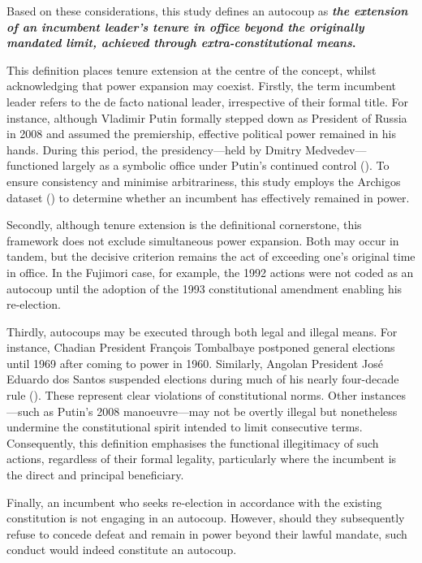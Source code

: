 \documentclass[
  12pt,
]{report}
\begin{document}
Based on these considerations, this study defines an autocoup as
\textbf{\emph{the extension of an incumbent leader's tenure in office
beyond the originally mandated limit, achieved through
extra-constitutional means}.}

This definition places tenure extension at the centre of the concept,
whilst acknowledging that power expansion may coexist. Firstly, the term
incumbent leader refers to the de facto national leader, irrespective of
their formal title. For instance, although Vladimir Putin formally
stepped down as President of Russia in 2008 and assumed the premiership,
effective political power remained in his hands. During this period, the
presidency---held by Dmitry Medvedev---functioned largely as a symbolic
office under Putin's continued control
(). To ensure consistency and
minimise arbitrariness, this study employs the Archigos dataset
() to
determine whether an incumbent has effectively remained in power.

Secondly, although tenure extension is the definitional cornerstone,
this framework does not exclude simultaneous power expansion. Both may
occur in tandem, but the decisive criterion remains the act of exceeding
one's original time in office. In the Fujimori case, for example, the
1992 actions were not coded as an autocoup until the adoption of the
1993 constitutional amendment enabling his re-election.

Thirdly, autocoups may be executed through both legal and illegal means.
For instance, Chadian President François Tombalbaye postponed general
elections until 1969 after coming to power in 1960. Similarly, Angolan
President José Eduardo dos Santos suspended elections during much of his
nearly four-decade rule ().
These represent clear violations of constitutional norms. Other
instances---such as Putin's 2008 manoeuvre---may not be overtly illegal
but nonetheless undermine the constitutional spirit intended to limit
consecutive terms. Consequently, this definition emphasises the
functional illegitimacy of such actions, regardless of their formal
legality, particularly where the incumbent is the direct and principal
beneficiary.

Finally, an incumbent who seeks re-election in accordance with the
existing constitution is not engaging in an autocoup. However, should
they subsequently refuse to concede defeat and remain in power beyond
their lawful mandate, such conduct would indeed constitute an autocoup.
\end{document}
